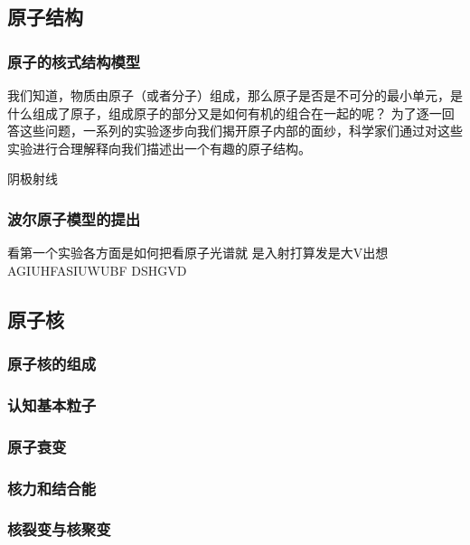 \begin{issues}
\issueTODO
\end{issues}

\subsection{原子结构}
\subsubsection{原子的核式结构模型}
我们知道，物质由原子（或者分子）组成，那么原子是否是不可分的最小单元，是什么组成了原子，组成原子的部分又是如何有机的组合在一起的呢？
为了逐一回答这些问题，一系列的实验逐步向我们揭开原子内部的面纱，科学家们通过对这些实验进行合理解释向我们描述出一个有趣的原子结构。

阴极射线
\subsubsection{波尔原子模型的提出}%

看第一个实验各方面是如何把看原子光谱就 是入射打算发是大V出想AGIUHFASIUWUBF 
DSHGVD 
\subsection{原子核}
\subsubsection{原子核的组成}
\subsubsection{认知基本粒子}
\subsubsection{原子衰变}
\subsubsection{核力和结合能}
\subsubsection{核裂变与核聚变}